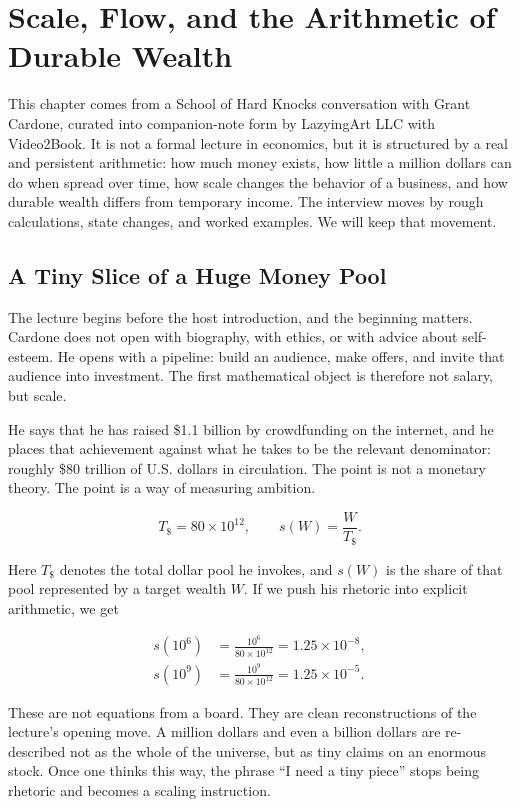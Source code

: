 \chapter{Scale, Flow, and the Arithmetic of Durable Wealth}

This chapter comes from a School of Hard Knocks conversation with Grant Cardone, curated into companion-note form by LazyingArt LLC with Video2Book. It is not a formal lecture in economics, but it is structured by a real and persistent arithmetic: how much money exists, how little a million dollars can do when spread over time, how scale changes the behavior of a business, and how durable wealth differs from temporary income. The interview moves by rough calculations, state changes, and worked examples. We will keep that movement.

\section{A Tiny Slice of a Huge Money Pool}

The lecture begins before the host introduction, and the beginning matters. Cardone does not open with biography, with ethics, or with advice about self-esteem. He opens with a pipeline: build an audience, make offers, and invite that audience into investment. The first mathematical object is therefore not salary, but scale.

He says that he has raised \$1.1 billion by crowdfunding on the internet, and he places that achievement against what he takes to be the relevant denominator: roughly \$80 trillion of U.S. dollars in circulation. The point is not a monetary theory. The point is a way of measuring ambition.

\begin{equation}
T_{\$}=80\times 10^{12},
\qquad
s(W)=\frac{W}{T_{\$}}.
\end{equation}

Here \(T_{\$}\) denotes the total dollar pool he invokes, and \(s(W)\) is the share of that pool represented by a target wealth \(W\). If we push his rhetoric into explicit arithmetic, we get

\begin{align}
s(10^6) &= \frac{10^6}{80\times 10^{12}} = 1.25\times 10^{-8},\\
s(10^9) &= \frac{10^9}{80\times 10^{12}} = 1.25\times 10^{-5}.
\end{align}

These are not equations from a board. They are clean reconstructions of the lecture's opening move. A million dollars and even a billion dollars are re-described not as the whole of the universe, but as tiny claims on an enormous stock. Once one thinks this way, the phrase ``I need a tiny piece'' stops being rhetoric and becomes a scaling instruction.

